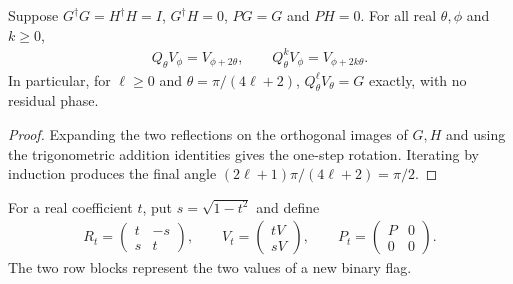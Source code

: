 \begin{lemma}
    \label{thm:mpu_exact_subspace_amplification}
    \leanok
    Suppose $G^\dagger G=H^\dagger H=I$, $G^\dagger H=0$,
    $PG=G$ and $PH=0$. For all real $\theta,\phi$ and $k\geq0$,
    \begin{align}
        Q_\theta V_\phi=V_{\phi+2\theta},
        \qquad Q_\theta^k V_\phi=V_{\phi+2k\theta}.
    \end{align}
    In particular, for $\ell\geq0$ and
    $\theta=\pi/(4\ell+2)$,
    $Q_\theta^\ell V_\theta=G$ exactly, with no residual phase.
\end{lemma}
\begin{proof}\leanok
    Expanding the two reflections on the orthogonal images of $G,H$
    and using the trigonometric addition identities gives the one-step rotation.
    Iterating by induction produces the final angle
    $(2\ell+1)\pi/(4\ell+2)=\pi/2$.
\end{proof}

\begin{definition}
    \label{def:mpu_uniform_success_attenuation}
    \leanok
    For a real coefficient $t$, put $s=\sqrt{1-t^2}$ and define
    \begin{align}
        R_t=\begin{pmatrix}t&-s\\s&t\end{pmatrix},
        \qquad V_t=\begin{pmatrix}tV\\sV\end{pmatrix},
        \qquad P_t=\begin{pmatrix}P&0\\0&0\end{pmatrix}.
    \end{align}
    The two row blocks represent the two values of a new binary flag.
\end{definition}

